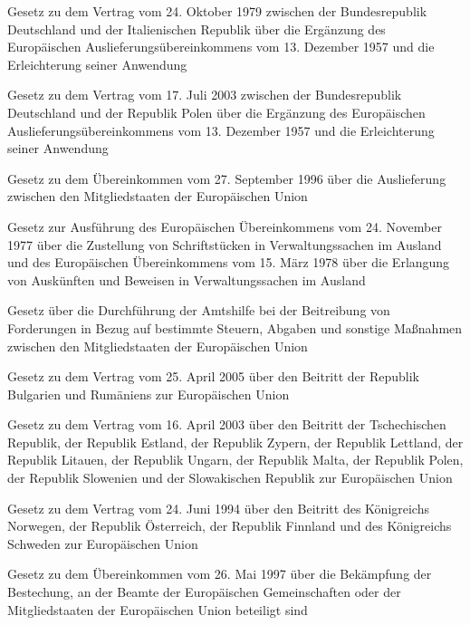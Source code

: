 \item[{EuAuslfÜbkErgVtrITAG}] Gesetz zu dem Vertrag vom 24. Oktober 1979 zwischen der Bundesrepublik Deutschland und der Italienischen Republik über die Ergänzung des Europäischen Auslieferungsübereinkommens vom 13. Dezember 1957 und die Erleichterung seiner Anwendung

\item[{EuAuslfÜbkErgVtrPOLG}] Gesetz zu dem Vertrag vom 17. Juli 2003 zwischen der Bundesrepublik Deutschland und der Republik Polen über die Ergänzung des Europäischen Auslieferungsübereinkommens vom 13. Dezember 1957 und die Erleichterung seiner Anwendung

\item[{EUAuslÜbkG}] Gesetz zu dem Übereinkommen vom 27. September 1996 über die Auslieferung zwischen den Mitgliedstaaten der Europäischen Union

\item[{EuAuslVwZ-AuskÜbkAG}] Gesetz zur Ausführung des Europäischen Übereinkommens vom 24. November 1977 über die Zustellung von Schriftstücken in Verwaltungssachen im Ausland und des Europäischen Übereinkommens vom 15. März 1978 über die Erlangung von Auskünften und Beweisen in Verwaltungssachen im Ausland

\item[{EUBeitrG}] Gesetz über die Durchführung der Amtshilfe bei der Beitreibung von Forderungen in Bezug auf bestimmte Steuern, Abgaben und sonstige Maßnahmen zwischen den Mitgliedstaaten der Europäischen Union

\item[{EUBeitrVtrBGR-ROMG}] Gesetz zu dem Vertrag vom 25. April 2005 über den Beitritt der Republik Bulgarien und Rumäniens zur Europäischen Union

\item[{EUBeitrVtrCZEuaG}] Gesetz zu dem Vertrag vom 16. April 2003 über den Beitritt der Tschechischen Republik, der Republik Estland, der Republik Zypern, der Republik Lettland, der Republik Litauen, der Republik Ungarn, der Republik Malta, der Republik Polen, der Republik Slowenien und der Slowakischen Republik zur Europäischen Union

\item[{EUBeitrVtrG}] Gesetz zu dem Vertrag vom 24. Juni 1994 über den Beitritt des Königreichs Norwegen, der Republik Österreich, der Republik Finnland und des Königreichs Schweden zur Europäischen Union

\item[{EUBestBekämpfÜbkG}] Gesetz zu dem Übereinkommen vom 26. Mai 1997 über die Bekämpfung der Bestechung, an der Beamte der Europäischen Gemeinschaften oder der Mitgliedstaaten der Europäischen Union beteiligt sind

